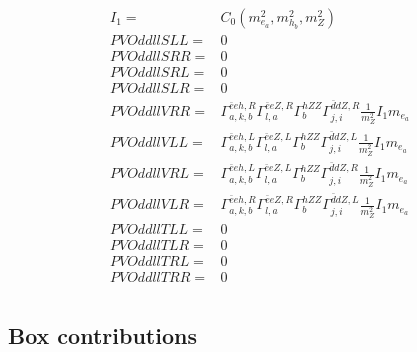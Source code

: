 \documentclass[A4,landscape]{article}
\begin{document}
\begin{align} 
I_1= & C_0(m^2_{e_{{a}}}, m^2_{h_{{b}}}, m^2_{Z}) \\ 
  PVOddllSLL= & 0 \\ 
  PVOddllSRR= & 0 \\ 
  PVOddllSRL= & 0 \\ 
  PVOddllSLR= & 0 \\ 
  PVOddllVRR= &  \Gamma^{\bar{e}e h ,R}_{a, k, b} \Gamma^{\bar{e}e Z ,R}_{l, a} \Gamma^{h Z Z }_{b} \Gamma^{\bar{d}d Z ,R}_{j, i} \frac{1}{m^2_{Z}} I_1 m_{e_{{a}}} \\ 
  PVOddllVLL= &  \Gamma^{\bar{e}e h ,L}_{a, k, b} \Gamma^{\bar{e}e Z ,L}_{l, a} \Gamma^{h Z Z }_{b} \Gamma^{\bar{d}d Z ,L}_{j, i} \frac{1}{m^2_{Z}} I_1 m_{e_{{a}}} \\ 
  PVOddllVRL= &  \Gamma^{\bar{e}e h ,L}_{a, k, b} \Gamma^{\bar{e}e Z ,L}_{l, a} \Gamma^{h Z Z }_{b} \Gamma^{\bar{d}d Z ,R}_{j, i} \frac{1}{m^2_{Z}} I_1 m_{e_{{a}}} \\ 
  PVOddllVLR= &  \Gamma^{\bar{e}e h ,R}_{a, k, b} \Gamma^{\bar{e}e Z ,R}_{l, a} \Gamma^{h Z Z }_{b} \Gamma^{\bar{d}d Z ,L}_{j, i} \frac{1}{m^2_{Z}} I_1 m_{e_{{a}}} \\ 
  PVOddllTLL= & 0 \\ 
  PVOddllTLR= & 0 \\ 
  PVOddllTRL= & 0 \\ 
  PVOddllTRR= & 0 \\ 
\end{align} 
\subsection{Box contributions} 
\end{document}
